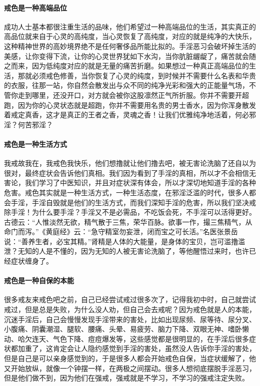 \paragraph{戒色是一种高端品位}

成功人士基本都很注重生活的品味，他们希望过一种高端品位的生活，其实真正的高品位就来自于心灵的高纯度，当心灵恢复了高纯度，对应的就是纯净的大快乐，这种精神世界的高妙境界绝不是任何奢侈品所能比拟的。手淫恶习会破坏掉生活的美感，让你变得下流，让你的心灵世界犹如下水沟，当你肮脏龌龊了，痛苦就会随之而来，因为低纯度对应的就是无量的痛苦折磨。如果想过一种真正高端品位的生活，那就必须戒色修善，当你恢复了心灵的纯度，到时候并不需要什么名表和华贵的衣服，往那一站，你自然会散发出与众不同的纯净光彩和强大的正能量气场，不管你走到哪里，还没开口，对方就会被你这股凛然正气所折服。你并不需要开超跑，因为你的心灵状态就是超跑，你并不需要用名贵的男士香水，因为你浑身散发着戒定真香，这才是真正的王者之香，灵魂之香！让我们优雅纯净地活着，何必邪淫？何苦邪淫？

\paragraph{戒色是一种生活方式}

我戒故我在，我戒色我快乐，他们想撸就让他们撸去吧，被无害论洗脑了还自以为很对，最终症状会告诉他们真相。我们因为看到了手淫的真相，所以才不会相信无害论，我们学习了中医知识，并且对症状深有体会，所以才深切地知道手淫的各种危害。戒色其实就是一种生活方式，一种生活态度，在邪淫泛滥的时代，很多人都会手淫，手淫自毁就是他们的生活方式，而我们深知手淫的危害，所以我们坚决戒除手淫！为什么要手淫？手淫又不是必需品，不吃饭会死，不手淫可以活得更好。古德云：“人惟淡然无欲，精气散于三焦，荣华百脉。欲事一作，撮三焦精气，从命门而泻。”《黄庭经》云：“急守精室勿妄泄，闭而宝之可长活。”名医张景岳说：“善养生者，必宝其精。”肾精是人体的大能量，是身体的宝贝，岂可滥撸滥泄？无知的人是不懂的，因为无知的人被无害论洗脑了，等他醒悟过来时，也许已经症状缠身了。

\paragraph{戒色是一种自保的本能}

很多戒友来戒色吧之前，自己已经尝试戒过很多次了，记得我初中时，自己就尝试戒过，但是总是失败，为什么没人劝，但自己会去戒呢？因为戒色就是人的本能，沉迷手淫后，自己会慢慢发现手淫带来的害处，比如出现尿频、尿等待、尿分叉、小腹痛、阴囊潮湿、腿软、腰痛、头晕、易疲劳、脑力下降、双眼无神、嗜卧懒动、哈欠连天、气色下降、痘痘爆发等，这些感觉都是很明显的，在手淫后很多症状都加重了，这肯定会让人隐约感觉到手淫的害处，虽然没人告诉你手淫的害处，但是自己是可以亲身感觉到的，于是很多人都会开始戒色自保，当症状缓解了，他又开始放纵，就像一个钟摆一样，在两极之间摆动。很多人想彻底摆脱手淫恶习，但是他们做不到，因为他们在强戒，强戒就是不学习，不学习的强戒注定失败。

